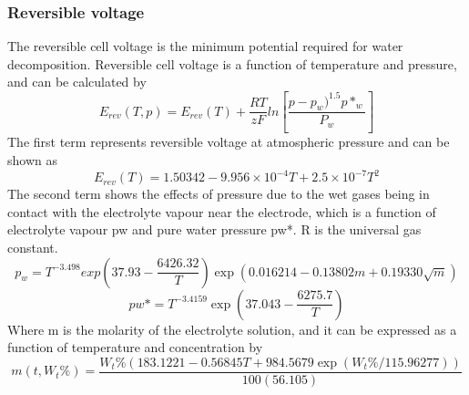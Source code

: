 \subsubsection{Reversible voltage} 
The reversible cell voltage is the minimum potential required for water decomposition. Reversible cell voltage is a function of temperature and pressure, and can be calculated by
\begin{equation} 
E_{rev}(T,p)=E_{rev}(T) + \frac{RT} {zF}ln[\frac{p-p_w)^{1.5}p*_w} {P_w} ]
\end{equation} 
The first term represents reversible voltage at atmospheric pressure and can be shown as
\begin{equation} 
E_{rev}(T)=1.50342-9.956 \times 10^{-4}T+2.5 \times10^{-7}T^2
\end{equation} 
 The second term shows the effects of pressure due to the wet gases being in contact with the electrolyte vapour near the electrode, which is a function of electrolyte vapour pw and pure water pressure pw*. R is the universal gas constant.
 \begin{equation} 
p_w=T^{-3.498} exp(37.93-\frac{6426.32} {T} )\exp(0.016214 - 0.13802m+0.19330\sqrt{m} ) 
\end{equation} 
\begin{equation}
pw*=T^{-3.4159} \exp(37.043-\frac{6275.7} {T} ) 
\end{equation} 
Where m is the molarity of the electrolyte solution, and it can be expressed as a function of temperature and  concentration by
\begin{equation} 
m(t, W_t\%) =\frac{W_t\%(183.1221-0.56845T+984.5679 \exp(W_t\%/115.96277))} {100(56.105)} 
\end{equation} 

